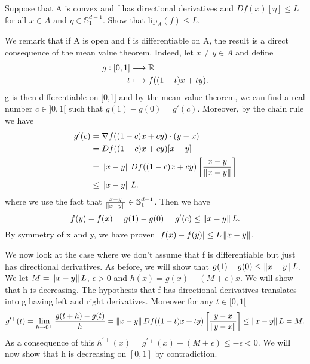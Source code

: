 \begin{exercise}[]{}
	Suppose that A is convex and f has directional derivatives and $ Df(x)[\eta] \leq L $ for all $ x \in A $ and $
	\eta \in \mathbb{S}^{d-1}_1$. Show that $ \text{lip}_A(f) \leq L. $
\end{exercise}

\begin{solution}[]
	We remark that if A is open and f is differentiable on A, the result is a direct consequence of the mean value theorem. Indeed, let
	$ x\neq y \in A$ and define 
\begin{align*}
g :[0,1]& \longrightarrow \mathbb{R} \\
t&\longmapsto f((1-t)x + ty) .
\end{align*}
g is then differentiable on [0,1] and by the mean value theorem, we can find a real number $ c\in ]0,1[ $ such that $ g(1) - g(0) =
g'(c)$. Moreover, by the chain rule we have 
\begin{align*}
	g'(c) &= \nabla f ((1-c) x + cy) \cdot (y-x)  \\
	      &= Df((1-c)x + cy)[x-y] \\
	      &= \left\|x-y\right\| Df((1-c)x + c y) \left[\frac{x-y}{\left\|x-y\right\|}\right]\\
	      &\leq \left\|x-y\right\|L.
\end{align*}
where we use the fact that $ \frac{x-y}{\left\|x-y\right\|} \in \mathbb{S}_1^{d-1} $.
Then we have 
\begin{equation*}
	f(y) - f(x) = g(1)-g(0) = g'(c) \leq \left\|x-y\right\|L.
\end{equation*}
By symmetry of x and y, we have proven $ |f(x) - f(y)| \leq L \left\|x-y\right\| $.

We now look at the case where we don't assume that f is differentiable but just has directional derivatives. As
before, we will show that $ g(1) - g(0) \leq  \left\|x-y\right\| L $. We let $ M = \left\|x-y\right\|L $, $ \epsilon>0 $ and $ h(x) =
g(x) - (M + \epsilon)x $. We will show that h is decreasing. The hypothesis that f has directional derivatives
translates into g having left and right derivatives. Moreover for any $ t\in [0,1[ $ 
\begin{equation*}
	g^{\prime +}(t) = \lim_{h \rightarrow 0^{+}} \frac{g(t+h)- g(t)}{h} = \left\|x-y\right\| Df((1-t)x +
	ty)\left[\frac{y-x}{\left\|y-x\right\|}\right] \leq  \left\|x-y\right\|L =M .
\end{equation*}
As a consequence of this $ h^{\prime+}(x) = g^{\prime+}(x) - (M+\epsilon) \leq -\epsilon < 0 $. We will now show that h
is decreasing on $ [0,1] $ by contradiction.


\end{solution}
